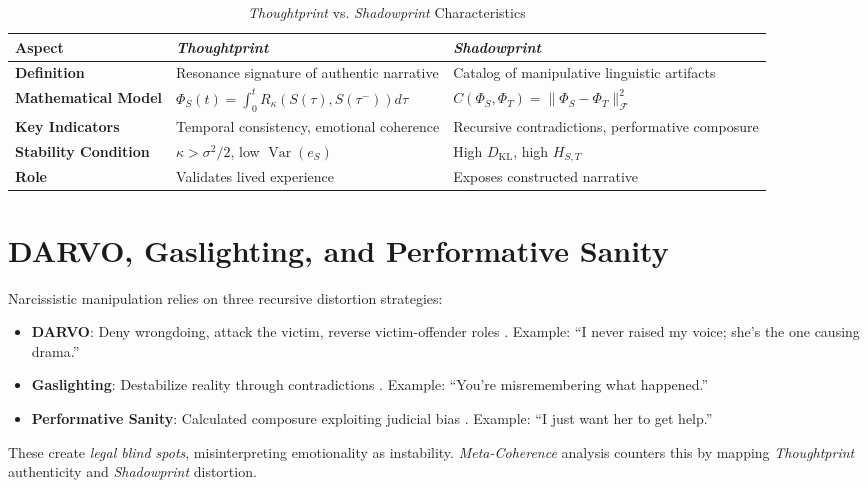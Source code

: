 \documentclass[11pt]{article}
\newcommand{\thoughtprint}{\textit{Thoughtprint}}
\newcommand{\shadowprint}{\textit{Shadowprint}}
\newcommand{\metacoherence}{\textit{Meta-Coherence}}
\begin{document}
\begin{table}[htbp]
\small
\centering
\caption{\thoughtprint{} vs. \shadowprint{} Characteristics}
\begin{tabular}{p{4cm}p{4.5cm}p{4.5cm}}
\toprule
\textbf{Aspect} & \textbf{\thoughtprint{}} & \textbf{\shadowprint{}} \\
\midrule
\textbf{Definition} & Resonance signature of authentic narrative & Catalog of manipulative linguistic artifacts \\
\textbf{Mathematical Model} & \(\Phi_S(t) = \int_0^t R_\kappa(S(\tau), S(\tau^-)) d\tau\) & \(C(\Phi_S, \Phi_T) = \|\Phi_S - \Phi_T\|_\mathcal{F}^2\) \\
\textbf{Key Indicators} & Temporal consistency, emotional coherence & Recursive contradictions, performative composure \\
\textbf{Stability Condition} & \(\kappa > \sigma^2/2\), low \(\operatorname{Var}(e_S)\) & High \(D_{\mathrm{KL}}\), high \(H_{S,T}\) \\
\textbf{Role} & Validates lived experience & Exposes constructed narrative \\
\bottomrule
\end{tabular}
\label{tab:dyad}
\end{table}

\section{DARVO, Gaslighting, and Performative Sanity}
\label{sec:distortions}
Narcissistic manipulation relies on three recursive distortion strategies:
\begin{itemize}
    \item \textbf{DARVO}: Deny wrongdoing, attack the victim, reverse victim-offender roles \citep{freyd1997}. Example: ``I never raised my voice; she's the one causing drama.''
    \item \textbf{Gaslighting}: Destabilize reality through contradictions \citep{stark2007}. Example: ``You're misremembering what happened.''
    \item \textbf{Performative Sanity}: Calculated composure exploiting judicial bias \citep{babcock2017}. Example: ``I just want her to get help.''
\end{itemize}
These create \textit{legal blind spots}, misinterpreting emotionality as instability. \metacoherence{} analysis counters this by mapping \thoughtprint{} authenticity and \shadowprint{} distortion.
\end{document}
